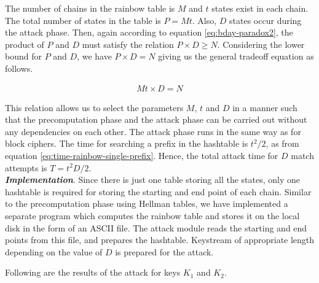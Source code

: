 The number of chains in the rainbow table is $M$ and $t$ states exist in each chain. The total number of states in the table is $P = Mt$. Also, $D$ states occur during the attack phase. Then, again according to equation \ref{eq:bday-paradox2}, the product of $P$ and $D$ must satisfy the relation $P \times D \geq N$. Considering the lower bound for $P$ and $D$, we have $P \times D = N$ giving us the general tradeoff equation as follows.

\begin{align}
\label{eq:general-rainbow-stream} Mt \times D = N
\end{align}
 
This relation allows us to select the parameters $M$, $t$ and $D$ in a manner such that the precomputation phase and the attack phase can be carried out without any dependencies on each other. The attack phase runs in the same way as for block ciphers. The time for searching a prefix in the hashtable is $t^2/2$, as from equation \ref{eq:time-rainbow-single-prefix}. Hence, the total attack time for $D$ match attempts is $T = t^2D/2$. \\

\noindent \textbf{\textit{Implementation}}. Since there is just one table storing all the states, only one hashtable is required for storing the starting and end point of each chain. Similar to the precomputation phase using Hellman tables, we have implemented a separate program which computes the rainbow table and stores it on the local disk in the form of an ASCII file. The attack module reads the starting and end points from this file, and prepares the hashtable. Keystream of appropriate length depending on the value of $D$ is prepared for the attack. 

Following are the results of the attack for keys $K_1$ and $K_2$. 

